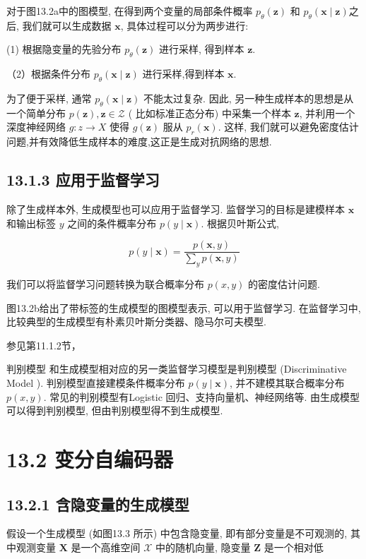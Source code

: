 \documentclass[10pt]{article}
\begin{document}
对于图13.2a中的图模型, 在得到两个变量的局部条件概率 $p_{\theta}(\boldsymbol{z})$ 和 $p_{\theta}(\boldsymbol{x} \mid \boldsymbol{z})$之后, 我们就可以生成数据 $\boldsymbol{x}$, 具体过程可以分为两步进行:

(1) 根据隐变量的先验分布 $p_{\theta}(\boldsymbol{z})$ 进行采样, 得到样本 $\boldsymbol{z}$.

（2）根据条件分布 $p_{\theta}(\boldsymbol{x} \mid \boldsymbol{z})$ 进行采样,得到样本 $\boldsymbol{x}$.

为了便于采样, 通常 $p_{\theta}(\boldsymbol{x} \mid \boldsymbol{z})$ 不能太过复杂. 因此, 另一种生成样本的思想是从一个简单分布 $p(\boldsymbol{z}), \boldsymbol{z} \in \mathcal{Z}$ ( 比如标准正态分布) 中采集一个样本 $\boldsymbol{z}$, 并利用一个深度神经网络 $g: z \rightarrow X$ 使得 $g(\boldsymbol{z})$ 服从 $p_{r}(\boldsymbol{x})$. 这样, 我们就可以避免密度估计问题,并有效降低生成样本的难度,这正是生成对抗网络的思想.

\subsection*{13.1.3 应用于监督学习}
除了生成样本外, 生成模型也可以应用于监督学习. 监督学习的目标是建模样本 $\boldsymbol{x}$ 和输出标签 $y$ 之间的条件概率分布 $p(y \mid \boldsymbol{x})$. 根据贝叶斯公式,


\begin{equation*}
p(y \mid \boldsymbol{x})=\frac{p(\boldsymbol{x}, y)}{\sum_{y} p(\boldsymbol{x}, y)} \tag{13.1}
\end{equation*}


我们可以将监督学习问题转换为联合概率分布 $p(x, y)$ 的密度估计问题.

图13.2b给出了带标签的生成模型的图模型表示, 可以用于监督学习. 在监督学习中, 比较典型的生成模型有朴素贝叶斯分类器、隐马尔可夫模型.

参见第11.1.2节，

判别模型 和生成模型相对应的另一类监督学习模型是判别模型 (Discriminative Model ). 判别模型直接建模条件概率分布 $p(y \mid \boldsymbol{x})$, 并不建模其联合概率分布 $p(x, y)$. 常见的判别模型有Logistic 回归、支持向量机、神经网络等. 由生成模型可以得到判别模型, 但由判别模型得不到生成模型.

\section*{13.2 变分自编码器}
\subsection*{13.2.1 含隐变量的生成模型}
假设一个生成模型 (如图13.3 所示) 中包含隐变量, 即有部分变量是不可观测的, 其中观测变量 $\boldsymbol{X}$ 是一个高维空间 $\mathcal{X}$ 中的随机向量, 隐变量 $\boldsymbol{Z}$ 是一个相对低
\end{document}
